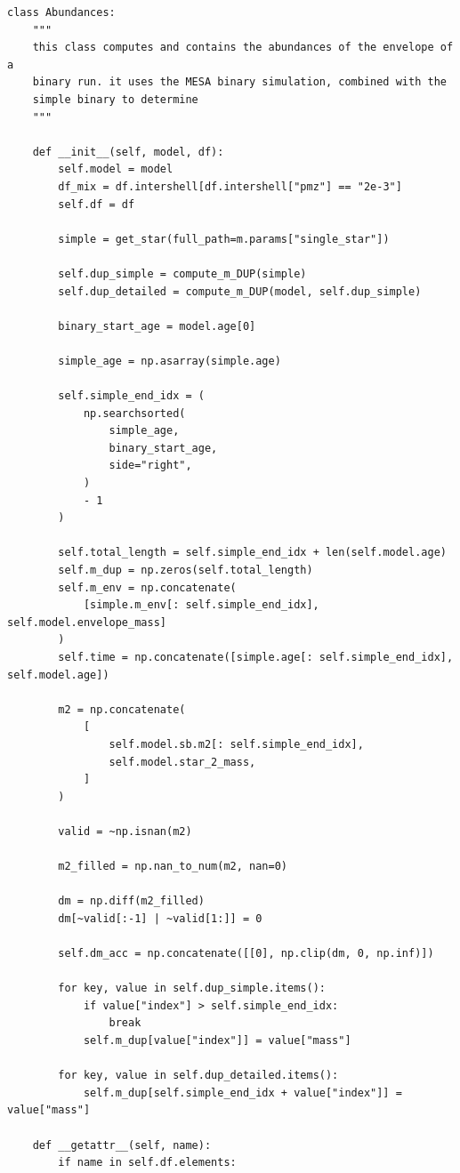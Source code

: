 \documentclass[a4paper,10pt]{article}
\begin{document}
\nextpage
\begin{verbatim}
class Abundances:
    """
    this class computes and contains the abundances of the envelope of a
    binary run. it uses the MESA binary simulation, combined with the
    simple binary to determine
    """

    def __init__(self, model, df):
        self.model = model
        df_mix = df.intershell[df.intershell["pmz"] == "2e-3"]
        self.df = df

        simple = get_star(full_path=m.params["single_star"])

        self.dup_simple = compute_m_DUP(simple)
        self.dup_detailed = compute_m_DUP(model, self.dup_simple)

        binary_start_age = model.age[0]

        simple_age = np.asarray(simple.age)

        self.simple_end_idx = (
            np.searchsorted(
                simple_age,
                binary_start_age,
                side="right",
            )
            - 1
        )

        self.total_length = self.simple_end_idx + len(self.model.age)
        self.m_dup = np.zeros(self.total_length)
        self.m_env = np.concatenate(
            [simple.m_env[: self.simple_end_idx], self.model.envelope_mass]
        )
        self.time = np.concatenate([simple.age[: self.simple_end_idx], self.model.age])

        m2 = np.concatenate(
            [
                self.model.sb.m2[: self.simple_end_idx],
                self.model.star_2_mass,
            ]
        )

        valid = ~np.isnan(m2)

        m2_filled = np.nan_to_num(m2, nan=0)

        dm = np.diff(m2_filled)
        dm[~valid[:-1] | ~valid[1:]] = 0

        self.dm_acc = np.concatenate([[0], np.clip(dm, 0, np.inf)])

        for key, value in self.dup_simple.items():
            if value["index"] > self.simple_end_idx:
                break
            self.m_dup[value["index"]] = value["mass"]

        for key, value in self.dup_detailed.items():
            self.m_dup[self.simple_end_idx + value["index"]] = value["mass"]

    def __getattr__(self, name):
        if name in self.df.elements:


\end{verbatim}
\end{document}
